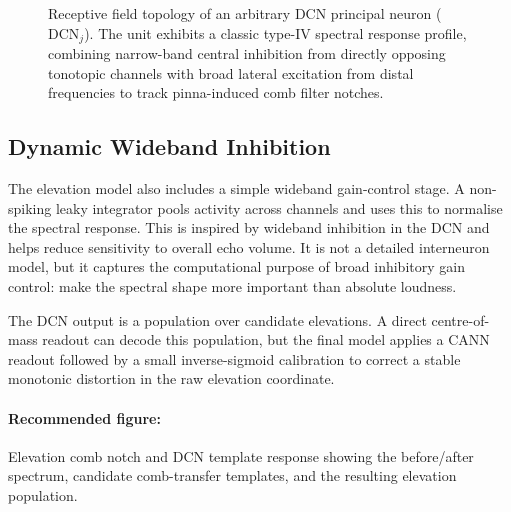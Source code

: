 \begin{figure}[htbp]
    \caption{Receptive field topology of an arbitrary DCN principal neuron ($\text{DCN}_j$). The unit exhibits a classic type-IV spectral response profile, combining narrow-band central inhibition from directly opposing tonotopic channels with broad lateral excitation from distal frequencies to track pinna-induced comb filter notches.}
    \label{fig:dcn_receptive_field}
\end{figure}

\subsection{Dynamic Wideband Inhibition}

The elevation model also includes a simple wideband gain-control stage. A non-spiking leaky integrator pools activity across channels and uses this to normalise the spectral response. This is inspired by wideband inhibition in the DCN and helps reduce sensitivity to overall echo volume. It is not a detailed interneuron model, but it captures the computational purpose of broad inhibitory gain control: make the spectral shape more important than absolute loudness.

The DCN output is a population over candidate elevations. A direct centre-of-mass readout can decode this population, but the final model applies a CANN readout followed by a small inverse-sigmoid calibration to correct a stable monotonic distortion in the raw elevation coordinate.

\paragraph{Recommended figure:} Elevation comb notch and DCN template response showing the before/after spectrum, candidate comb-transfer templates, and the resulting elevation population.

